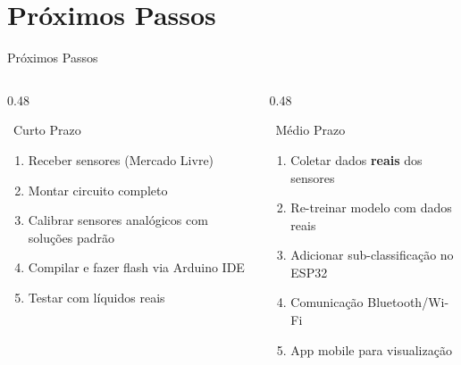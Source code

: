 \documentclass[aspectratio=169, 11pt]{beamer}
\begin{document}
\section{Próximos Passos}

\begin{frame}{Próximos Passos}
  \begin{columns}[T]
    \begin{column}{0.48\textwidth}
      \begin{block}{\faClock\ Curto Prazo}
        \begin{enumerate}
          \item Receber sensores (Mercado Livre)
          \item Montar circuito completo
          \item Calibrar sensores analógicos com soluções padrão
          \item Compilar e fazer flash via Arduino IDE
          \item Testar com líquidos reais
        \end{enumerate}
      \end{block}
    \end{column}
    \begin{column}{0.48\textwidth}
      \begin{block}{\faRocket\ Médio Prazo}
        \begin{enumerate}
          \item Coletar dados \textbf{reais} dos sensores
          \item Re-treinar modelo com dados reais
          \item Adicionar sub-classificação no ESP32
          \item Comunicação Bluetooth/Wi-Fi
          \item App mobile para visualização
        \end{enumerate}
      \end{block}
    \end{column}
  \end{columns}
  \vspace{0.5cm}
  \begin{center}
  \end{center}
\end{frame}
\end{document}
